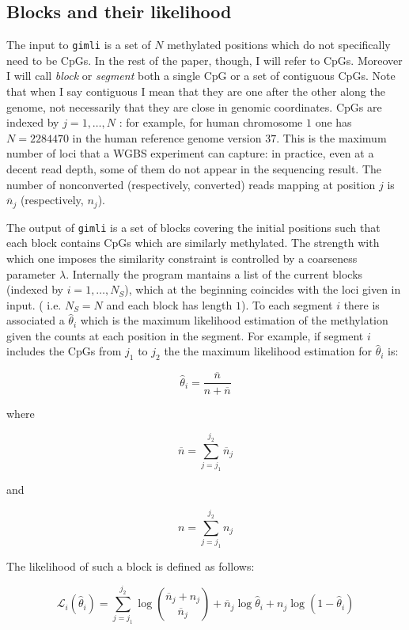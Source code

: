 \documentclass[12pt]{amsart}
\newcommand{\lik}{\ensuremath{\mathcal{L}}}
\newcommand{\gimli}{\texttt{gimli}}
\begin{document}
\subsection{Blocks and their likelihood}
The  input to \gimli{} is a set of $N$ methylated positions 
which do not specifically need to be CpGs.
In the rest of the paper, though, I will refer to CpGs. Moreover 
I will call {\em block} or {\em segment} 
both a single CpG or a set of contiguous CpGs. 
Note that when I say contiguous I mean that they are one
after the other along the genome, not necessarily that they are
close in genomic coordinates. CpGs are 
indexed by $j=1,\dots,N$ : for example, for human chromosome $1$ 
one has $N = 2284470$ in the human reference genome version $37$.
This is the maximum number of loci that a WGBS experiment can capture: 
in practice, even at a decent read depth,
some of them do not appear in the sequencing result. 
The number of nonconverted (respectively, converted) reads mapping at 
position $j$ is $\overline{n}_j$ (respectively, $n_j$). 

The output of \gimli{} is a set of blocks 
covering the initial positions 
such that each block contains CpGs which are similarly
methylated. The strength with which
one imposes the similarity constraint
is controlled by a coarseness parameter $\lambda$.
Internally the program  mantains a list of the current  
blocks (indexed by $i=1,\dots,N_S$), 
which at the beginning 
coincides with the loci given in input. 
( i.e.  $N_S=N$ and each block has length $1$). 
To each segment $i$ there is associated a $\hat{\theta}_i$ which
is the maximum likelihood estimation of the methylation given the counts
at each position in the segment. 
For example, if segment $i$ includes the CpGs from $j_1$ to $j_2$
the the maximum likelihood estimation for $\hat{\theta}_i$ is:

\[
\hat{\theta}_i=\frac{\overline{n}}{n + \overline{n}}
\]

where

\[
\overline{n}=\sum_{j=j_1}^{j_2} \overline{n}_j
\]

and

\[
n=\sum_{j=j_1}^{j_2} n_j
\]

The likelihood of such a block is defined as follows:

\begin{equation}
\lik_i(\hat{\theta}_i)=\sum_{j=j_1}^{j_2} 
\log {\overline{n}_j+n_j \choose \overline{n}_j} +
	{\overline{n}_j}\log\hat{\theta}_i+
	n_j\log(1-\hat{\theta}_i)
\end{equation}
\label{loglik}
\end{document}
